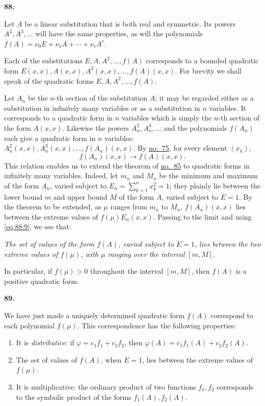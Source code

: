 \documentclass[
  paper=b5,
  fontsize=13pt,
  twoside=true,
  open=any,
  bookmarkpackage=false,
  chapterprefix=true,
  headings=normal
]{scrbook}
\theoremstyle{definition}
\newcommand{\numberedparagraph}[1]{%
  \par\medskip\phantomsection\label{sec:#1}%
  \noindent\textbf{#1.}\enspace
}
\begin{document}
\numberedparagraph{88}
Let \(A\) be a linear substitution that is both real and symmetric.  Its powers
\(A^2,A^3,\ldots\) will have the same properties, as will the polynomials
\(f(A)=\nu_0E+\nu_1A+\cdots+\nu_rA^r\).

Each of the substitutions \(E,A,A^2,\ldots,f(A)\) corresponds to a bounded
quadratic form \(E(x,x),A(x,x),A^2(x,x),\ldots,f(A)(x,x)\).  For brevity we
shall speak of the quadratic forms \(E,A,A^2,\ldots,f(A)\).

Let \(A_n\) be the \(n\)-th section of the substitution \(A\); it may be regarded
either as a substitution in infinitely many variables or as a substitution in
\(n\) variables.  It corresponds to a quadratic form in \(n\) variables which
is simply the \(n\)-th section of the form \(A(x,x)\).  Likewise the powers
\(A_n^2,A_n^3,\ldots\) and the polynomials \(f(A_n)\) each give a quadratic form
in \(n\) variables: \(A_n^2(x,x),A_n^3(x,x),\ldots,f(A_n)(x,x)\).  By
\hyperref[sec:75]{no.~75}, for every element \((x_k)\),
\begin{equation}
  f(A_n)(x,x)\longrightarrow f(A)(x,x).
  \tag{9}\label{eq:88:9}
\end{equation}
This relation enables us to extend the theorem of \hyperref[sec:85]{no.~85} to
quadratic forms in infinitely many variables.  Indeed, let \(m_n\) and \(M_n\)
be the minimum and maximum of the form \(A_n\), varied subject to
\(E_n=\sum_{k=1}^{n}x_k^2=1\); they plainly lie between the lower bound \(m\)
and upper bound \(M\) of the form \(A\), varied subject to \(E=1\).  By the
theorem to be extended, as \(\mu\) ranges from \(m_n\) to \(M_n\),
\(f(A_n)(x,x)\) lies between the extreme values of \(f(\mu)E_n(x,x)\).  Passing
to the limit and using \eqref{eq:88:9}, we see that:

\emph{The set of values of the form \(f(A)\), varied subject to \(E=1\), lies
between the two extreme values of \(f(\mu)\), with \(\mu\) ranging over the
 interval \([m,M]\).}

In particular, if \(f(\mu)>0\) throughout the interval \([m,M]\), then \(f(A)\)
is a positive quadratic form.

\numberedparagraph{89}
We have just made a uniquely determined quadratic form \(f(A)\) correspond to
each polynomial \(f(\mu)\).  This correspondence has the following properties:

\begin{enumerate}[label=\Roman*.]
\item It is \emph{distributive}: if \(\varphi=c_1f_1+c_2f_2\), then
\(\varphi(A)=c_1f_1(A)+c_2f_2(A)\).
\item The set of values of \(f(A)\), when \(E=1\), lies between the extreme
values of \(f(\mu)\).
\item It is multiplicative: the ordinary product of two functions \(f_1,f_2\)
corresponds to the symbolic product of the forms \(f_1(A),f_2(A)\).
\end{enumerate}
\end{document}
